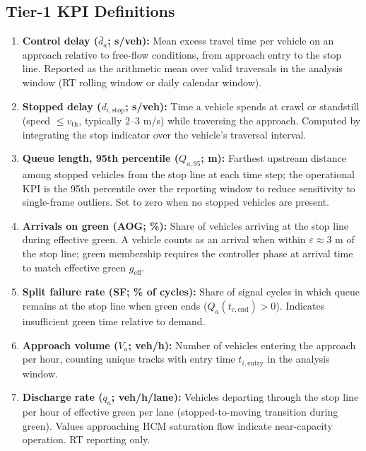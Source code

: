 \documentclass[11pt]{article}
\begin{document}
\subsection{Tier-1 KPI Definitions}

\begin{enumerate}
\item \textbf{Control delay ($\bar d_a$; s/veh):} Mean excess travel time per vehicle on an approach relative to free-flow conditions, from approach entry to the stop line. Reported as the arithmetic mean over valid traversals in the analysis window (RT rolling window or daily calendar window).

\item \textbf{Stopped delay ($d_{i,\mathrm{stop}}$; s/veh):} Time a vehicle spends at crawl or standstill (speed $\leq v_{\mathrm{th}}$, typically 2--3 m/s) while traversing the approach. Computed by integrating the stop indicator over the vehicle's traversal interval.

\item \textbf{Queue length, 95th percentile ($Q_{a,95}$; m):} Farthest upstream distance among stopped vehicles from the stop line at each time step; the operational KPI is the 95th percentile over the reporting window to reduce sensitivity to single-frame outliers. Set to zero when no stopped vehicles are present.

\item \textbf{Arrivals on green (AOG; \%):} Share of vehicles arriving at the stop line during effective green. A vehicle counts as an arrival when within $\varepsilon \approx 3$ m of the stop line; green membership requires the controller phase at arrival time to match effective green $g_{\mathrm{eff}}$.

\item \textbf{Split failure rate (SF; \% of cycles):} Share of signal cycles in which queue remains at the stop line when green ends ($Q_a(t_{c,\mathrm{end}})>0$). Indicates insufficient green time relative to demand.

\item \textbf{Approach volume ($V_a$; veh/h):} Number of vehicles entering the approach per hour, counting unique tracks with entry time $t_{i,\mathrm{entry}}$ in the analysis window.

\item \textbf{Discharge rate ($q_a$; veh/h/lane):} Vehicles departing through the stop line per hour of effective green per lane (stopped-to-moving transition during green). Values approaching HCM saturation flow indicate near-capacity operation. RT reporting only.
\end{enumerate}
\end{document}
